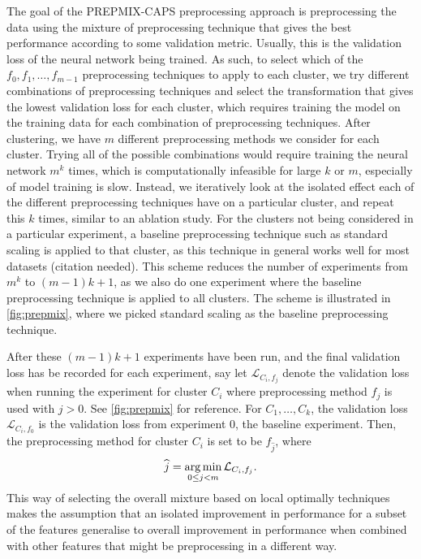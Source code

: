 \documentclass{statsmsc}
\begin{document}
The goal of the \ac{PREPMIX-CAPS} preprocessing approach is preprocessing the
data using the mixture of preprocessing technique that gives the best
performance according to some validation metric. Usually, this is the
validation loss of the neural network being trained. As such, to select which
of the $f_0, f_1,\dots,f_{m-1}$ preprocessing techniques to apply to each
cluster, we try different combinations of preprocessing techniques and select
the transformation that gives the lowest validation loss for each cluster,
which requires training the model on the training data for each combination of
preprocessing techniques.  After clustering, we have $m$ different
preprocessing methods we consider for each cluster. Trying all of the possible
combinations would require training the neural network $m^k$ times, which is
computationally infeasible for large $k$ or $m$, especially of model training
is slow. Instead, we iteratively look at the isolated effect each of the
different preprocessing techniques have on a particular cluster, and repeat
this $k$ times, similar to an ablation study. For the clusters not being
considered in a particular experiment, a baseline preprocessing technique such
as standard scaling is applied to that cluster, as this technique in general
works well for most datasets (citation needed). This scheme reduces the number
of experiments from $m^k$ to $(m-1)k+1$, as we also do one experiment where the
baseline preprocessing technique is applied to all clusters. The scheme is
illustrated in \cref{fig:prepmix}, where we picked standard scaling as the
baseline preprocessing technique.

After these $(m-1)k+1$ experiments have been run, and the final validation loss has be recorded
for each experiment, say let $\mathcal{L}_{C_{i},f_j}$ denote the validation loss when running
the experiment for cluster $C_i$ where preprocessing method $f_j$ is used with $j>0$.
See \cref{fig:prepmix} for reference. For $C_1,\dots,C_k$, the validation loss
$\mathcal{L}_{C_i,f_0}$ is the validation loss from experiment 0, the baseline experiment.
Then, the preprocessing method for cluster $C_i$ is set to be $f_{\widehat{j}}$, where
\begin{equation}
    \widehat{j}=\operatorname*{arg\,min}_{0 \leq j < m}  \mathcal{L}_{C_i,f_j}.
\end{equation}
This way of selecting the overall mixture based on local optimally techniques makes the assumption
that an isolated improvement in performance for a subset of the features generalise to overall
improvement in performance when combined with other features that might be preprocessing in a
different way.
\end{document}
